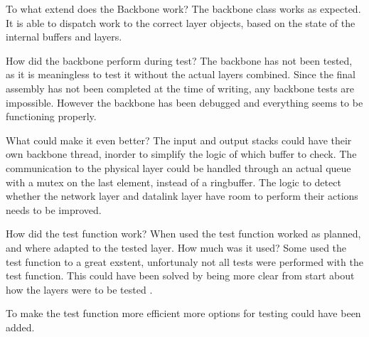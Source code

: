 To what extend does the Backbone work? 
The backbone class works as expected. It is able to dispatch work to the correct layer objects, based on the state of the internal buffers and layers.

How did the backbone perform during test?
The backbone has not been tested, as it is meaningless to test it without the actual layers combined. Since the final assembly has not been completed at the time of writing, any backbone tests are impossible. However the backbone has been debugged and everything seems to be functioning properly.

What could make it even better?
The input and output stacks could have their own backbone thread, inorder to simplify the logic of which buffer to check.
The communication to the physical layer could be handled through an actual queue with a mutex on the last element, instead of a ringbuffer. The logic to detect whether the network layer and datalink layer have room to perform their actions needs to be improved.


How did the test function work?
When used the test function worked as planned, and where adapted to the tested layer. 
How much was it used?
Some used the test function to a great exstent, unfortunaly not all tests were performed with the test function. This could have been solved by being more clear from start about how the layers were to be tested . 

To make the test function more efficient more options for testing could have been added.

